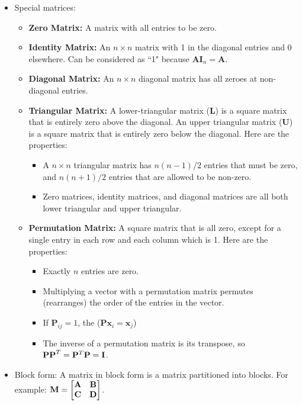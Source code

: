 \documentclass[12pt]{article}
\begin{document}
    \begin{itemize}
        \item Special matrices:
            \begin{itemize}
                \item \textbf{Zero Matrix:} A matrix with all entries to be zero.
                \item \textbf{Identity Matrix:} An $n \times n$ matrix with 1 in the diagonal entries and 0 elsewhere. Can be considered as ``1" because $\mathbf{AI}_n = \mathbf{A}$.
                \item \textbf{Diagonal Matrix:} An $n \times n$ diagonal matrix has all zeroes at non-diagonal entries.
                \item \textbf{Triangular Matrix:} A lower-triangular matrix ($\mathbf{L}$) is a square matrix that is entirely zero above the diagonal. An upper triangular matrix ($\mathbf{U}$) is a square matrix that is entirely zero below the diagonal. Here are the properties:
                    \begin{itemize}
                        \item A $n \times n$ triangular matrix has $n(n-1)/2$ entries that must be zero, and $n(n+1)/2$ entries that are allowed to be non-zero.
                        \item Zero matrices, identity matrices, and diagonal matrices are all both lower triangular and upper triangular.
                    \end{itemize} 
                \item \textbf{Permutation Matrix:} A square matrix that is all zero, except for a single entry in each row and each column which is 1. Here are the properties:
                    \begin{itemize}
                        \item Exactly $n$ entries are zero.
                        \item Multiplying a vector with a permutation matrix permutes (rearranges) the order of the entries in the vector.
                        \item If $\mathbf{P}_{ij} = 1$, the ($\mathbf{Px}_i = \mathbf{x}_j$)
                        \item The inverse of a permutation matrix is its transpose, so ${\bf PP}^T = {\bf P}^T{\bf P} = {\bf I}$.
                    \end{itemize}
            \end{itemize}
        \item Block form: A matrix in block form is a matrix partitioned into blocks. For example: $\displaystyle {\bf M} = \begin{bmatrix} {\bf A} & {\bf B} \\ {\bf C} & {\bf D} \end{bmatrix}$.


\end{itemize}
\end{document}
